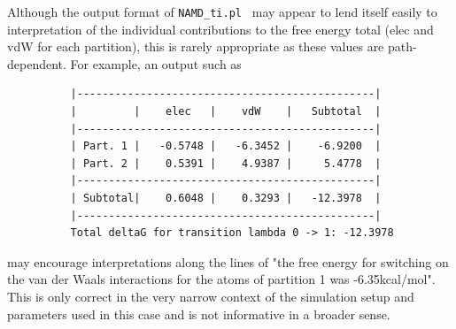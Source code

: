 Although the output format of {\tt NAMD\_ti.pl } may appear to lend itself easily to interpretation of the
individual contributions to the free energy total (elec and vdW for each partition), this is rarely
appropriate as these values are path-dependent. For example, an output such as


\begin{verbatim}
          |-----------------------------------------------|
          |         |    elec   |    vdW    |   Subtotal  |
          |-----------------------------------------------|
          | Part. 1 |   -0.5748 |   -6.3452 |    -6.9200  |
          | Part. 2 |    0.5391 |    4.9387 |     5.4778  |
          |-----------------------------------------------|
          | Subtotal|    0.6048 |    0.3293 |   -12.3978  |
          |-----------------------------------------------|
          Total deltaG for transition lambda 0 -> 1: -12.3978
\end{verbatim}


\noindent may encourage interpretations along the lines of "the free energy for
switching on the van der Waals interactions for the atoms of partition 1 was
-6.35kcal/mol". This is only correct in the very narrow context of the
simulation setup and parameters used in this case and is not informative in a
broader sense.


